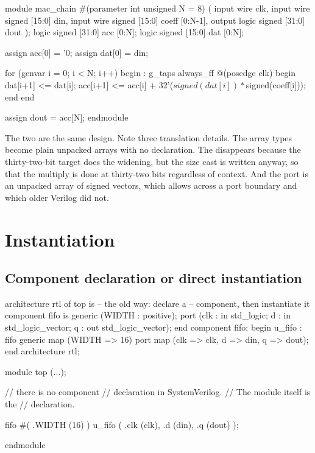\begin{svcode}[caption={The same chain in \SV{}.},label={lst:rosetta:systolic-sv}]
module mac_chain #(parameter int unsigned N = 8) (
  input  wire                clk,
  input  wire signed [15:0]  din,
  input  wire signed [15:0]  coeff [0:N-1],
  output logic signed [31:0] dout
);
  logic signed [31:0] acc [0:N];
  logic signed [15:0] dat [0:N];

  assign acc[0] = '0;
  assign dat[0] = din;

  for (genvar i = 0; i < N; i++) begin : g_taps
    always_ff @(posedge clk) begin
      dat[i+1] <= dat[i];
      acc[i+1] <= acc[i] + 32'($signed(dat[i]) * $signed(coeff[i]));
    end
  end

  assign dout = acc[N];
endmodule
\end{svcode}

The two are the same design. Note three translation details. The \VHDL{} array
types become plain unpacked arrays with no  declaration. The
 disappears because the thirty-two-bit target does the
widening, but the  size cast is written anyway, so that the
multiply is done at thirty-two bits regardless of context. And the
 port is an unpacked array of signed vectors, which \SV{} allows
across a port boundary and which older Verilog did not.

\section{Instantiation}
\label{sec:rosetta:instantiation}

\subsection{Component declaration or direct instantiation}

\begin{rosetta}
\begin{rleft}
architecture rtl of top is
  -- the old way: declare a
  -- component, then instantiate it
  component fifo is
    generic (WIDTH : positive);
    port (clk : in  std_logic;
          d   : in  std_logic_vector;
          q   : out std_logic_vector);
  end component fifo;
begin
  u_fifo : fifo
    generic map (WIDTH => 16)
    port map (clk => clk,
              d   => din,
              q   => dout);
end architecture rtl;
\end{rleft}
\begin{rright}
module top (...);

  // there is no component
  // declaration in SystemVerilog.
  // The module itself is the
  // declaration.

  fifo #(
    .WIDTH (16)
  ) u_fifo (
    .clk (clk),
    .d   (din),
    .q   (dout)
  );

endmodule
\end{rright}
\end{rosetta}

